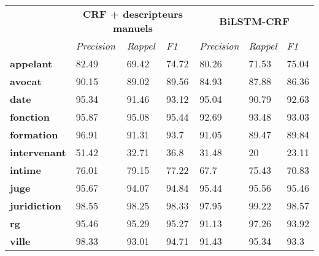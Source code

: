 \begin{table}[!h]
	\scriptsize
	\centering
	\begin{tabular}{|l|l|l|l|l|l|l|}
		\hline
		&               \multicolumn{3}{c}{\textbf{CRF + descripteurs manuels}} & \multicolumn{3}{|c|}{\textbf{BiLSTM-CRF}}   \\ \cline{2-7}
		& \textit{Precision} & \textit{Rappel}                     & \textit{F1} & \textit{Precision} & \textit{Rappel}      & \textit{F1} \\ \hline
		\textbf{appelant}      & 82.49              & 69.42                               & 74.72       & 80.26              & 71.53                & 75.04       \\ 
		\textbf{avocat}        & 90.15              & 89.02                               & 89.56       & 84.93              & 87.88                & 86.36       \\ 
		\textbf{date}          & 95.34              & 91.46                               & 93.12       & 95.04              & 90.79                & 92.63       \\ 
		\textbf{fonction}      & 95.87              & 95.08                               & 95.44       & 92.69              & 93.48                & 93.03       \\ 
		\textbf{formation}     & 96.91              & 91.31                               & 93.7        & 91.05              & 89.47                & 89.84       \\ 
		\textbf{intervenant}   & 51.42              & 32.71                               & 36.8        & 31.48              & 20                   & 23.11       \\ 
		\textbf{intime}        & 76.01              & 79.15                               & 77.22       & 67.7               & 75.43                & 70.83       \\ 
		\textbf{juge}          & 95.67              & 94.07                               & 94.84       & 95.44              & 95.56                & 95.46       \\ 
		\textbf{juridiction}   & 98.55              & 98.25                               & 98.33       & 97.95              & 99.22                & 98.57       \\ 
		\textbf{rg}            & 95.46              & 95.29                               & 95.27       & 91.13              & 97.26                & 93.92       \\ 
		\textbf{ville}         & 98.33              & 93.01                               & 94.71       & 91.43              & 95.34                & 93.3        \\ 

\end{tabular}
\end{table}
